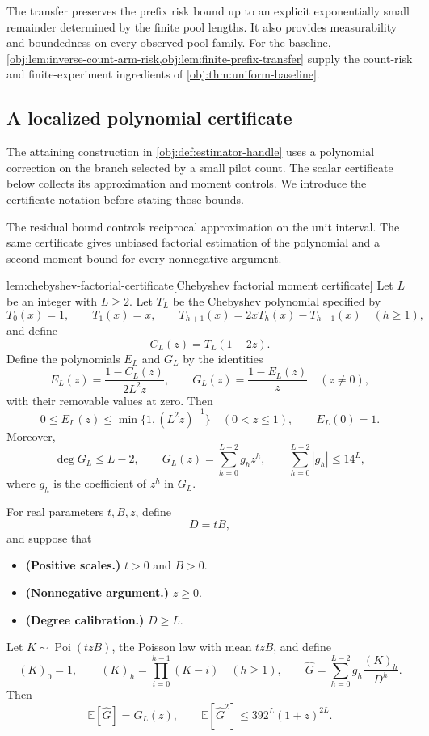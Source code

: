 The transfer preserves the prefix risk bound up to an explicit exponentially small remainder determined by the finite pool lengths. It also provides measurability and boundedness on every observed pool family. For the baseline, \cref{obj:lem:inverse-count-arm-risk,obj:lem:finite-prefix-transfer} supply the count-risk and finite-experiment ingredients of \cref{obj:thm:uniform-baseline}.

\subsection{A localized polynomial certificate}

The attaining construction in \cref{obj:def:estimator-handle} uses a polynomial correction on the branch selected by a small pilot count. The scalar certificate below collects its approximation and moment controls. We introduce the certificate notation before stating those bounds.



The residual bound controls reciprocal approximation on the unit interval. The same certificate gives unbiased factorial estimation of the polynomial and a second-moment bound for every nonnegative argument.

\begin{lemmav}{lem:chebyshev-factorial-certificate}[Chebyshev factorial moment certificate]
Let \(L\) be an integer with \(L\ge2\). Let \(T_L\) be the Chebyshev polynomial specified by
\[
T_0(x)=1,\qquad T_1(x)=x,\qquad
T_{h+1}(x)=2xT_h(x)-T_{h-1}(x)\quad(h\ge1),
\]
and define
\[
C_L(z)=T_L(1-2z).
\]
Define the polynomials \(E_L\) and \(G_L\) by the identities
\[
E_L(z)=\frac{1-C_L(z)}{2L^2z},
\qquad
G_L(z)=\frac{1-E_L(z)}{z}
\quad(z\ne0),
\]
with their removable values at zero. Then
\[
0\le E_L(z)\le\min\{1,(L^2z)^{-1}\}
\quad(0<z\le1),
\qquad E_L(0)=1.
\]
Moreover,
\[
\deg G_L\le L-2,\qquad
G_L(z)=\sum_{h=0}^{L-2}g_hz^h,\qquad
\sum_{h=0}^{L-2}|g_h|\le14^L,
\]
where \(g_h\) is the coefficient of \(z^h\) in \(G_L\).

For real parameters \(t,B,z\), define
\[
D=tB,
\]
and suppose that
\begin{itemize}
\item \textbf{(Positive scales.)} \(t>0\) and \(B>0\).
\item \textbf{(Nonnegative argument.)} \(z\ge0\).
\item \textbf{(Degree calibration.)} \(D\ge L\).
\end{itemize}
Let \(K\sim\operatorname{Poi}(tzB)\), the Poisson law with mean \(tzB\), and define
\[
(K)_0=1,\qquad
(K)_h=\prod_{i=0}^{h-1}(K-i)\quad(h\ge1),
\qquad
\widehat G=\sum_{h=0}^{L-2}g_h\frac{(K)_h}{D^h}.
\]
Then
\[
\mathbb E[\widehat G]=G_L(z),
\qquad
\mathbb E[\widehat G^2]\le392^L(1+z)^{2L}.
\]
\end{lemmav}

